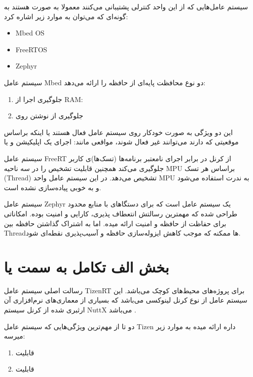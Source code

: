 \documentclass[10pt, a4paper]{article}
\begin{document}
سیستم عامل‌هایی که از این واحد کنترلی پشتیبانی می‌کنند معمولا به صورت  هستند به گونه‌ای‌ که می‌توان به موارد زیر اشاره کرد:

\begin{itemize}
    \item Mbed OS
    \item FreeRTOS
    \item Zephyr
\end{itemize}

سیستم عامل Mbed دو نوع محافظت پایه‌ای از حافظه را ارائه می‌دهد:

\begin{enumerate}
    \item جلوگیری اجرا از RAM: 
    \item جلوگیری از نوشتن روی 
\end{enumerate}

این دو ویژگی به صورت خودکار روی سیستم عامل فعال هستند یا اینکه براساس موقعیتی که
دارند می‌توانند غیر فعال شوند، مواقعی مانند: اجرای یک اپلیکیشن و یا 

سیستم عامل FreeRT از کرنل در برابر اجرای نامعتبر برنامه‌ها (تسک‌ها)ی کاربر
جلوگیری می‌کند همچنین قابلیت تشخیص  را در سه ناحیه MPU براساس
هر تسک (Thread) تشخیص می‌دهد. در این سیستم عامل واحد MPU به ندرت استفاده می‌شود
و به خوبی پیاده‌سازی نشده است.

سیستم عامل Zephyr یک سیستم عامل  است که برای دستگاهای با منابع
محدود طراحی شده که مهمترین رسالتش انتعطاف پذیری، کارایی و امنیت بوده. امکاناتی
برای حفاظت از حافظه و امنیت ارائه میده. اما به اشتراک گذاشتن حافظه بین Threadها
ممکنه که موجب کاهش ایزوله‌سازی حافظه و آسیب‌پذیری نقطه‌ای شود.

\section{بخش الف تکامل به سمت  یا }

رسالت اصلی سیستم عامل TizenRT برای پروژه‌های محیط‌های کوچک می‌باشد. این سیستم
عامل از نوع کرنل لینوکسی می‌باشد که بسیاری از معماری‌های نرم‌افزاری آن ارثبری
شده از کرنل سیستم NuttX می‌باشد \cite{nuttx}.

دو تا از مهم‌ترین ویژگی‌هایی که سیستم عامل Tizen داره ارائه میده به موارد زیر
میرسه:

\begin{enumerate}
    \item قابلیت 
    \item قابلیت 
\end{enumerate}
\end{document}
